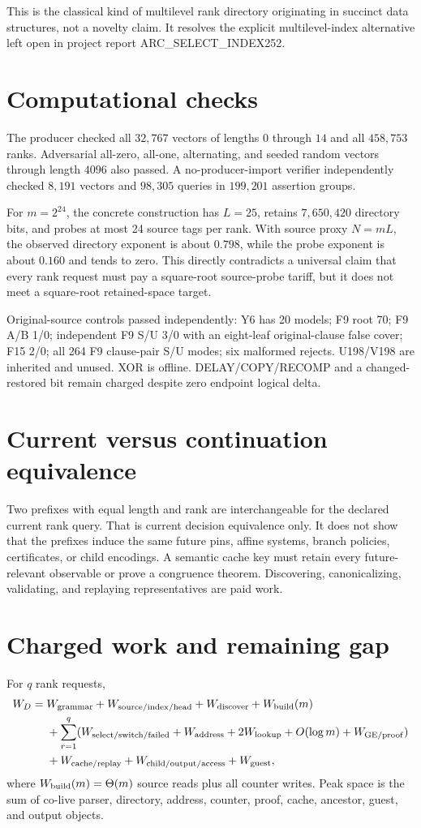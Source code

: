 \documentclass[11pt]{article}
\begin{document}
This is the classical kind of multilevel rank directory originating in
succinct data structures, not a novelty claim. It resolves the explicit
multilevel-index alternative left open in project report ARC\_SELECT\_INDEX252.

\section{Computational checks}
The producer checked all $32{,}767$ vectors of lengths $0$ through $14$ and
all $458{,}753$ ranks. Adversarial all-zero, all-one, alternating, and seeded
random vectors through length $4096$ also passed. A no-producer-import
verifier independently checked $8{,}191$ vectors and $98{,}305$ queries in
$199{,}201$ assertion groups.

For $m=2^{24}$, the concrete construction has $L=25$, retains $7{,}650{,}420$
directory bits, and probes at most 24 source tags per rank. With source proxy
$N=mL$, the observed directory exponent is about $0.798$, while the probe
exponent is about $0.160$ and tends to zero. This directly contradicts a
universal claim that every rank request must pay a square-root source-probe
tariff, but it does not meet a square-root retained-space target.

Original-source controls passed independently: Y6 has 20 models; F9 root 70;
F9 A/B 1/0; independent F9 S/U 3/0 with an eight-leaf original-clause false
cover; F15 2/0; all 264 F9 clause-pair S/U modes; six malformed rejects.
U198/V198 are inherited and unused. XOR is offline. DELAY/COPY/RECOMP and a
changed-restored bit remain charged despite zero endpoint logical delta.

\section{Current versus continuation equivalence}
Two prefixes with equal length and rank are interchangeable for the declared
current rank query. That is current decision equivalence only. It does not
show that the prefixes induce the same future pins, affine systems, branch
policies, certificates, or child encodings. A semantic cache key must retain
every future-relevant observable or prove a congruence theorem. Discovering,
canonicalizing, validating, and replaying representatives are paid work.

\section{Charged work and remaining gap}
For $q$ rank requests,
\[
\begin{split}
W_D={}&W_{\rm grammar}+W_{\rm source/index/head}+W_{\rm discover}
+W_{\rm build}(m)\\
&+\sum_{r=1}^{q}(W_{\rm select/switch/failed}+W_{\rm address}
+2W_{\rm lookup}+O(\log m)+W_{\rm GE/proof})\\
&+W_{\rm cache/replay}+W_{\rm child/output/access}+W_{\rm guest},
\end{split}
\]
where $W_{\rm build}(m)=\Theta(m)$ source reads plus all counter writes.
Peak space is the sum of co-live parser, directory, address, counter, proof,
cache, ancestor, guest, and output objects.
\end{document}
